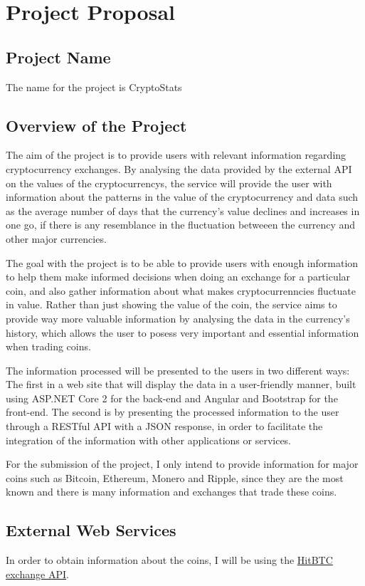 \chapter{Project Proposal}
\section{Project Name}
The name for the project is CryptoStats
\section{Overview of the Project}
The aim of the project is to provide users with relevant information regarding cryptocurrency exchanges. By analysing the data provided by the external API on the values of the cryptocurrencys, the service will provide the user with information about the patterns in the value of the cryptocurrency and data such as the average number of days that the currency's value declines and increases in one go, if there is any resemblance in the fluctuation betweeen the currency and other major currencies.

The goal with the project is to be able to provide users with enough information to help them make informed decisions when doing an exchange for a particular coin, and also gather information about what makes cryptocurrenncies fluctuate in value. Rather than just showing the value of the coin, the service aims to provide way more valuable information by analysing the data in the currency's history, which allows the user to posess very important and essential information when trading coins.

The information processed will be presented to the users in two different ways: The first in a web site that will display the data in a user-friendly manner, built using ASP.NET Core 2 for the back-end and Angular and Bootstrap for the front-end. The second is by presenting the processed information to the user through a RESTful API with a JSON response, in order to facilitate the integration of the information with other applications or services.

For the submission of the project, I only intend to provide information for major coins such as Bitcoin, Ethereum, Monero and Ripple, since they are the most known and there is many information and exchanges that trade these coins.
\section{External Web Services}
In order to obtain information about the coins, I will be using the \href{https://api.hitbtc.com}{HitBTC exchange API}.


